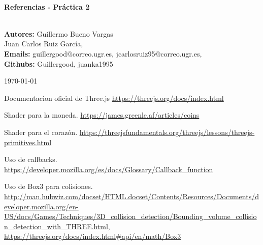 \documentclass[12zpt]{article}
\begin{document}
\begin{center}
 			\vspace*{1cm}																		%
\HRule \\[0.4cm]																	%
{ \huge \bfseries Referencias - Práctica 2}\\[0.4cm]	%
\HRule \\[1.5cm]																	%
\begin{minipage}{0.46\textwidth}													%
\begin{center} \large															%
\textbf{Autores:} Guillermo Bueno Vargas\\
Juan Carlos Ruiz García,\\
\textbf{Emails:} guillergood@correo.ugr.es, jcarlosruiz95@correo.ugr.es,\\
\textbf{Githubs:} Guillergood, juanka1995\\ 
\end{center}																		%
\end{minipage}		
\vspace{7cm} 																				
\begin{center}																					
{\large \today}																	%
 			\end{center}												  						
\end{center}							 											
																					
\newpage																		


\begin{thebibliography}{9}
	Documentacion oficial de Three.js
	\url{https://threejs.org/docs/index.html}
	
	Shader para la moneda.
	\url{https://james.greenle.af/articles/coins}

	Shader para el corazón.
	\url{https://threejsfundamentals.org/threejs/lessons/threejs-primitives.html}

	Uso de callbacks.
	\url{https://developer.mozilla.org/es/docs/Glossary/Callback_function}
	
	Uso de Box3 para colisiones.
	\url{http://man.hubwiz.com/docset/HTML.docset/Contents/Resources/Documents/developer.mozilla.org/en-US/docs/Games/Techniques/3D_collision_detection/Bounding_volume_collision_detection_with_THREE.html},
	\url{https://threejs.org/docs/index.html#api/en/math/Box3}
\end{thebibliography}


% 

\end{document}
